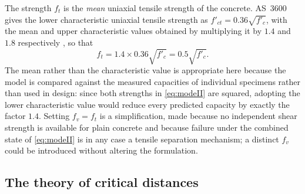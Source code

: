 The strength $f_t$ is the \emph{mean} uniaxial tensile strength of the
concrete. AS~3600 gives the lower characteristic uniaxial tensile strength as
$f'_{ct} = 0.36\sqrt{f'_c}$, with the mean and upper characteristic values
obtained by multiplying it by $1.4$ and $1.8$ respectively
\parencite{ReinforcedConcreteBasics2021}, so that
\begin{equation}
\label{eq:ft}
f_t = 1.4 \times 0.36\sqrt{f'_c} = 0.5\sqrt{f'_c} .
\end{equation}
The mean rather than the characteristic value is appropriate here because the
model is compared against the measured capacities of individual specimens
rather than used in design: since both strengths in \eqref{eq:modeII} are
squared, adopting the lower characteristic value would reduce every predicted
capacity by exactly the factor $1.4$. Setting $f_v = f_t$ is a
simplification, made because no independent shear strength is available for
plain concrete and because failure under the combined state of
\eqref{eq:modeII} is in any case a tensile separation mechanism; a distinct
$f_v$ could be introduced without altering the formulation.

\newpage
\subsection{The theory of critical distances}
\label{sec:tcd}

